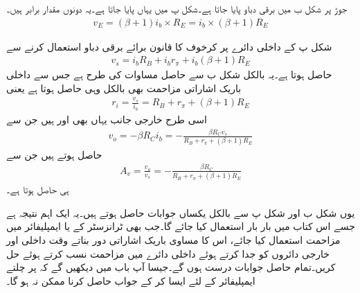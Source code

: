 جوڑ  پر شکل  ب میں  برقی دباو پایا جاتا ہے۔شکل  پ میں یہاں  پایا جاتا ہے۔یہ دونوں مقدار برابر ہیں۔
\begin{align*}
v_E=\left(\beta+1 \right) i_b \times R_E =i_b \times \left(\beta+1 \right)R_E
\end{align*}

شکل  پ کے داخلی دائرے پر کرخوف کا قانون برائے برقی دباو استعمال کرنے سے
\begin{align*}
v_s = i_b R_B+i_b r_{\pi}  + i_b \left(\beta+1 \right )R_E
\end{align*}
حاصل ہوتا ہے۔یہ بالکل شکل  ب سے حاصل مساوات کی طرح ہے  جس سے داخلی باریک اشاراتی مزاحمت بھی بالکل وہی حاصل ہوتا ہے یعنی
\begin{align*}
r_i=\frac{v_s}{i_b}=R_B+r_{\pi}+\left(\beta+1 \right )R_E
\end{align*}
اسی طرح خارجی جانب یہاں بھی  اور  ہیں جن سے
\begin{align*}
v_o=-\beta R_C i_b = -\frac{\beta R_C v_s}{R_B+r_{\pi}+\left ( \beta+1\right )R_E}
\end{align*}
حاصل ہوتے ہیں جن سے
\begin{align*}
A_v=\frac{v_o}{v_s}=-\frac{\beta R_C}{R_B+r_{\pi}+\left(\beta+1 \right )R_E}
\end{align*} 
ہی حاصل ہوتا ہے۔

یوں شکل  ب اور شکل  پ سے بالکل یکساں جوابات حاصل ہوتے ہیں۔یہ ایک اہم نتیجہ ہے جسے اس کتاب میں بار بار استعمال کیا جائے گا۔جب بھی  ٹرانزسٹر کے  یا  ایمپلیفائر میں مزاحمت  استعمال کیا جائے، اس کا مساوی باریک اشاراتی دور بناتے وقت داخلی اور خارجی دائروں کو جدا کرتے ہوئے داخلی دائرے میں  مزاحمت نسب کرتے ہوئے حل کریں۔تمام حاصل جوابات درست ہوں گے۔جیسا آپ  باب  میں دیکھیں گے کہ  پر چلتے ایمپلیفائر کے لئے ایسا کر کے جواب حاصل کرنا ممکن نہ ہو گا۔

